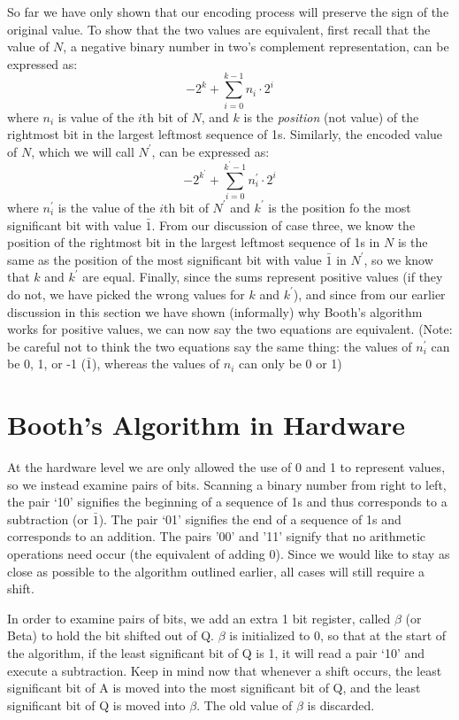 \documentclass{article}
\begin{document}
So far we have only shown that our encoding process will preserve the sign of the original value.
To show that the two values are equivalent, first recall that the value of $N$, a negative binary number in two's complement representation, can be expressed as:
\[-2^k + \sum_{i=0}^{k-1} n_i \cdot 2^i\]
where $n_i$ is value of the $i$th bit of $N$, and $k$ is the \emph{position} (not value) of the rightmost bit in the largest leftmost sequence of 1s.
Similarly, the encoded value of $N$, which we will call $N^{\prime}$, can be expressed as:
\[-2^{k^{\prime}} + \sum_{i=0}^{k^{\prime}-1} n_i^{\prime} \cdot 2^i\]
where $n_i^{\prime}$ is the value of the $i$th bit of $N^{\prime}$ and $k^{\prime}$ is the position fo the most significant bit with value $\bar{1}$.
From our discussion of case three, we know the position of the rightmost bit in the largest leftmost sequence of 1s in $N$ is the same as the position of the most significant bit with value $\bar{1}$ in $N^{\prime}$, so we know that $k$ and $k^{\prime}$ are equal.
Finally, since the sums represent positive values (if they do not, we have picked the wrong values for $k$ and $k^{\prime}$), and since from our earlier discussion in this section we have shown (informally) why Booth's algorithm works for positive values, we can now say the two equations are equivalent.
(Note: be careful not to think the two equations say the same thing: the values of $n_i^{\prime}$ can be 0, 1, or -1 ($\bar{1}$), whereas the values of $n_i$ can only be 0 or 1)

\section{Booth's Algorithm in Hardware}
    At the hardware level we are only allowed the use of 0 and 1 to represent values, so we instead examine pairs of bits.
Scanning a binary number from right to left, the pair `10' signifies the beginning of a sequence of 1s and thus corresponds to a subtraction (or $\bar{1}$).
The pair `01' signifies the end of a sequence of 1s and corresponds to an addition.
The pairs '00' and '11' signify that no arithmetic operations need occur (the equivalent of adding 0).
Since we would like to stay as close as possible to the algorithm outlined earlier, all cases will still require a shift.

    In order to examine pairs of bits, we add an extra 1 bit register, called $\beta$ (or Beta) to hold the bit shifted out of Q.
$\beta$ is initialized to 0, so that at the start of the algorithm, if the least significant bit of Q is 1, it will read a pair `10' and execute a subtraction.
Keep in mind now that whenever a shift occurs, the least significant bit of A is moved into the most significant bit of Q, and the least significant bit of Q is moved into $\beta$.
The old value of $\beta$ is discarded.
\end{document}
